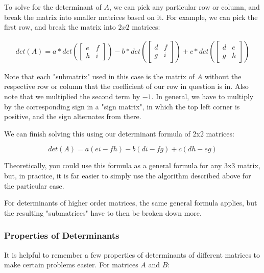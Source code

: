 \documentclass[12pt]{article}
\begin{document}
To solve for the determinant of $A$, we can pick any particular row or column, and break the matrix into smaller matrices based on it. For example, we can pick the first row, and break the matrix into $2x2$ matrices:

\begin{equation}
    \begin{split}
        det(A) = a*det(\begin{bmatrix}
            e & f\\
            h & i
            \end{bmatrix}) - b*det(\begin{bmatrix}
            d & f\\
            g & i
            \end{bmatrix}) + c*det(\begin{bmatrix}
            d & e\\
            g & h
            \end{bmatrix})
    \end{split}
\end{equation}

Note that each "submatrix" used in this case is the matrix of $A$ without the respective row or column that the coefficient of our row in question is in. Also note that we multiplied the second term by $-1$. In general, we have to multiply by the corresponding sign in a "sign matrix", in which the top left corner is positive, and the sign alternates from there.

We can finish solving this using our determinant formula of 2x2 matrices:

\[
    det(A) = a(ei - fh) - b(di-fg) + c(dh-eg)
\]

Theoretically, you could use this formula as a general formula for any 3x3 matrix, but, in practice, it is far easier to simply use the algorithm described above for the particular case.

For determinants of higher order matrices, the same general formula applies, but the resulting "submatrices" have to then be broken down more.

\subsubsection{Properties of Determinants}

It is helpful to remember a few properties of determinants of different matrices to make certain problems easier. For matrices $A$ and $B$:
\end{document}
